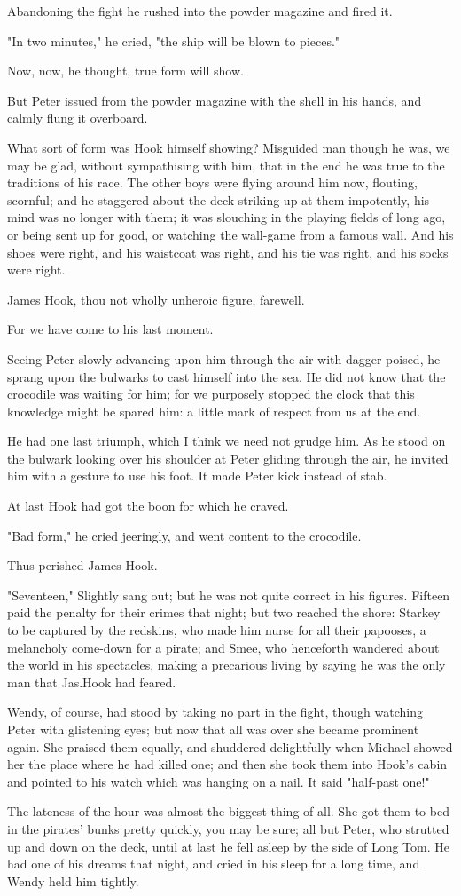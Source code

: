 Abandoning the fight he rushed into the powder magazine and fired it.

"In two minutes," he cried, "the ship will be blown to pieces."

Now, now, he thought, true form will show.

But Peter issued from the powder magazine with the shell in his hands, and calmly flung it overboard.

What sort of form was Hook himself showing?
Misguided man though he was, we may be glad, without sympathising with him, that in the end he was true to the traditions of his race.
The other boys were flying around him now, flouting, scornful;
and he staggered about the deck striking up at them impotently, his mind was no longer with them;
it was slouching in the playing fields of long ago, or being sent up for good, or watching the wall-game from a famous wall.
And his shoes were right, and his waistcoat was right, and his tie was right, and his socks were right.

James Hook, thou not wholly unheroic figure, farewell.

For we have come to his last moment.

Seeing Peter slowly advancing upon him through the air with dagger poised, he sprang upon the bulwarks to cast himself into the sea.
He did not know that the crocodile was waiting for him;
for we purposely stopped the clock that this knowledge might be spared him:
a little mark of respect from us at the end.

He had one last triumph, which I think we need not grudge him.
As he stood on the bulwark looking over his shoulder at Peter gliding through the air, he invited him with a gesture to use his foot.
It made Peter kick instead of stab.

At last Hook had got the boon for which he craved.

"Bad form," he cried jeeringly, and went content to the crocodile.

Thus perished James Hook.

"Seventeen," Slightly sang out;
but he was not quite correct in his figures.
Fifteen paid the penalty for their crimes that night;
but two reached the shore:
Starkey to be captured by the redskins, who made him nurse for all their papooses, a melancholy come-down for a pirate;
and Smee, who henceforth wandered about the world in his spectacles, making a precarious living by saying he was the only man that Jas.\@ Hook had feared.

Wendy, of course, had stood by taking no part in the fight, though watching Peter with glistening eyes;
but now that all was over she became prominent again.
She praised them equally, and shuddered delightfully when Michael showed her the place where he had killed one;
and then she took them into Hook's cabin and pointed to his watch which was hanging on a nail.
It said "half-past one!"

The lateness of the hour was almost the biggest thing of all.
She got them to bed in the pirates' bunks pretty quickly, you may be sure;
all but Peter, who strutted up and down on the deck, until at last he fell asleep by the side of Long Tom.
He had one of his dreams that night, and cried in his sleep for a long time, and Wendy held him tightly.
